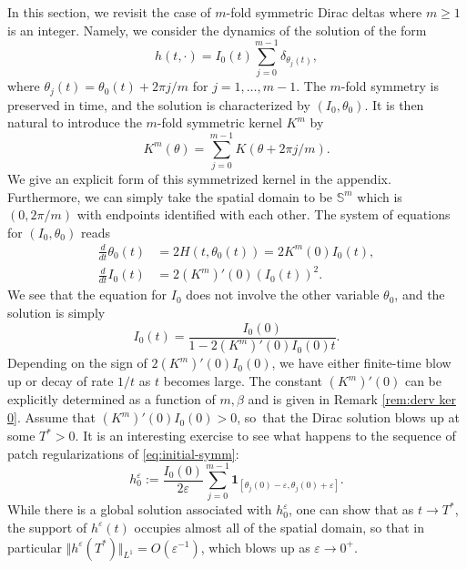 \documentclass[10pt]{amsart}
\theoremstyle{plain}
\theoremstyle{definition}
\newcommand{\nrm}[1]{\Vert#1\Vert}
\let\bt\beta
\let\dlt\delta
\let\tht\theta
\let\varep\varepsilon
\newcommand{\bbS}{\mathbb S}
\begin{document}
In this section, we revisit the case of $m$-fold symmetric Dirac deltas where $m\ge1$ is an integer. Namely, we consider the dynamics of the solution of the form
\begin{equation}\label{eq:initial-symm}
h(t,\cdot) = I_{0}(t) \sum_{j=0}^{m-1} \dlt_{\tht_{j}(t)},
\end{equation}
where $\tht_{j}(t) = \tht_{0}(t) + 2\pi j/m$ for $j = 1,\dots, m-1$. The $m$-fold symmetry is preserved in time, and the solution is characterized by $(I_{0}, \tht_{0})$. It is then natural to introduce the $m$-fold symmetric kernel $K^{m}$ by
\begin{equation*}
K^{m}(\tht) = \sum_{j=0}^{m-1} K(\tht+ 2\pi j/m).
\end{equation*}
We give an explicit form of this symmetrized kernel in the appendix. Furthermore, we can simply take the spatial domain to be $\bbS^{m}$ which is $(0,2\pi/m)$ with endpoints identified with each other. The system of equations for $(I_{0}, \tht_{0})$ reads
\begin{align}\label{eq:dirac-$m$-fold-tht}
\frac{d}{dt} \tht_{0}(t) &= 2H(t,\tht_{0}(t)) = 2 K^{m}(0)I_{0}(t),
\\
\label{eq:dirac-$m$-fold-I}
\frac{d}{dt} I_{0}(t) &= 2 (K^{m})'(0) (I_{0}(t))^2.
\end{align}
We see that the equation for $I_{0}$ does not involve the other variable $\tht_{0}$, and the solution is simply
\begin{equation*}
I_{0}(t) = \frac{I_{0}(0)}{1 - 2 (K^{m})'(0) I_{0}(0) t}.
\end{equation*}
Depending on the sign of $2 (K^{m})'(0) I_{0}(0)$, we have either finite-time blow up or decay of rate $1/t$ as $t$ becomes large. The constant $ (K^{m})'(0) $ can be explicitly determined as a function of $m,\bt$ and is given in Remark \ref{rem:derv ker 0}. Assume that $ (K^{m})'(0) I_{0}(0) > 0$, so~that the Dirac solution blows up at some $T^*>0$. It is an interesting exercise to see what happens to the sequence of patch regularizations of \eqref{eq:initial-symm}:\vspace*{-3pt}
\begin{equation}\label{eq:initial-patch}
h_{0}^{\varep} := \frac{I_{0}(0)}{2\varep} \sum_{j=0}^{m-1} \mathbf{1}_{[\tht_{j}(0)-\varep, \tht_{j}(0)+\varep]}.
\end{equation}
While there is a global solution associated with $h_{0}^{\varep} $, one can show that as $t\to T^*$, the support of $h^{\varep}(t) $ occupies almost all of the spatial domain, so that in particular $\nrm{ h^{\varep} (T^*) }_{L^{1}} = O(\varep^{-1})$, which blows up as $\varep\to 0^+$.
\end{document}
